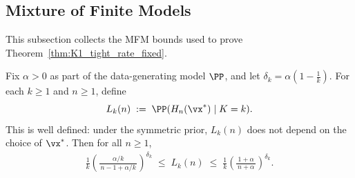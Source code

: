 \subsection{Mixture of Finite Models}
This subsection collects the MFM bounds used to prove
Theorem~\ref{thm:K1_tight_rate_fixed}.

\begin{lemma}\label{lem:Lk_twosided_fixed}
Fix $\alpha>0$ as part of the data-generating model $\PP$, and let
$\delta_k=\alpha(1-\tfrac1k)$. For each $k\ge 1$ and $n\ge 1$, define
\[
L_k(n)\;:=\;\PP(H_n(\vx^*)\mid K=k).
\]
This is well defined: under the symmetric prior, $L_k(n)$ does not depend on
the choice of $\vx^*$. Then for all $n\ge 1$,
\begin{align}
\frac1k\left(\frac{\alpha/k}{\,n-1+\alpha/k\,}\right)^{\delta_k}
\;\le\;
L_k(n)
\;\le\;
\frac1k\left(\frac{1+\alpha}{\,n+\alpha\,}\right)^{\delta_k}.
\label{eq:Lk_twosided_fixed}
\end{align}
\end{lemma}

